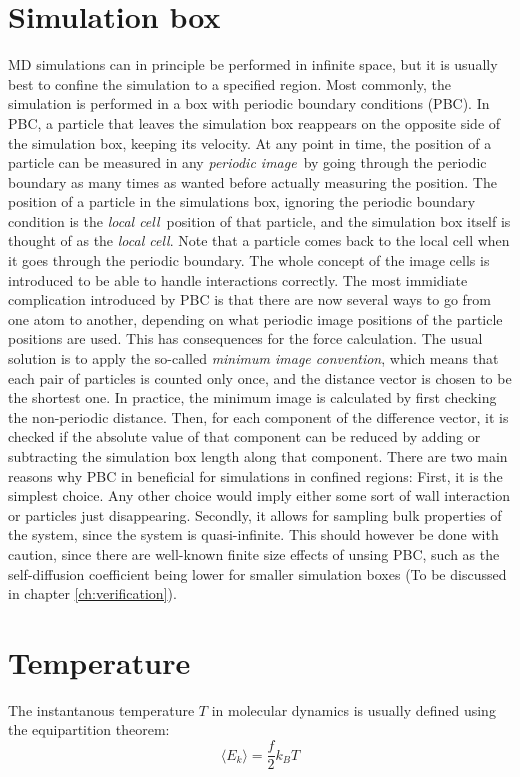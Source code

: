 \section{Simulation box}
MD simulations can in principle be performed in infinite space, but it is usually best to confine the simulation to a specified region. Most commonly, the simulation is performed in a box with periodic boundary conditions (PBC). In PBC, a particle that leaves the simulation box reappears on the opposite side of the simulation box, keeping its velocity. At any point in time, the position of a particle can be measured in any \emph{periodic image} by going through the periodic boundary as many times as wanted before actually measuring the position. The position of a particle in the simulations box, ignoring the periodic boundary condition is the \emph{local cell} position of that particle, and the simulation box itself is thought of as the \emph{local cell}. Note that a particle comes back to the local cell when it goes through the periodic boundary. The whole concept of the image cells is introduced to be able to handle interactions correctly. The most immidiate complication introduced by PBC is that there are now several ways to go from one atom to another, depending on what periodic image positions of the particle positions are used. This has consequences for the force calculation. The usual solution is to apply the so-called \emph{minimum image convention}, which means that each pair of particles is counted only once, and the distance vector is chosen to be the shortest one. In practice, the minimum image is calculated by first checking the non-periodic distance. Then, for each component of the difference vector, it is checked if the absolute value of that component can be reduced by adding or subtracting the simulation box length along that component.
There are two main reasons why PBC in beneficial for simulations in confined regions: First, it is the simplest choice. Any other choice would imply either some sort of wall interaction or particles just disappearing. Secondly, it allows for sampling bulk properties of the system, since the system is quasi-infinite. This should however be done with caution, since there are well-known finite size effects of unsing PBC, such as the self-diffusion coefficient being lower for smaller simulation boxes (To be discussed in chapter \ref{ch:verification}).

\section{Temperature}
The instantanous temperature $T$ in molecular dynamics is usually defined using the equipartition theorem:
\begin{equation}
	\langle E_k \rangle = \frac{f}{2}k_B T
\end{equation}

